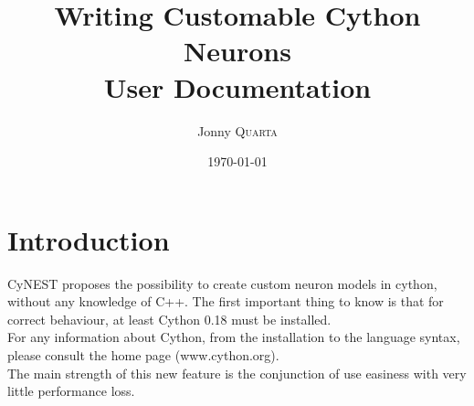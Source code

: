 \documentclass{article}
\title{Writing Customable Cython Neurons \\ User Documentation} %
\author{Jonny \textsc{Quarta}} %
\date{\today} %
\begin{document}
\maketitle %


\setlength\parindent{0pt} %

\renewcommand{\labelenumi}{\alph{enumi}.} %

\section{Introduction}
CyNEST proposes the possibility to create custom neuron models in cython, without any knowledge of C++. The first important thing to know is that for correct behaviour, at least Cython 0.18 must be installed.\\
For any information about Cython, from the installation to the language syntax, please consult the home page (www.cython.org).\\

The main strength of this new feature is the conjunction of use easiness with very little performance loss.\\
\end{document}

